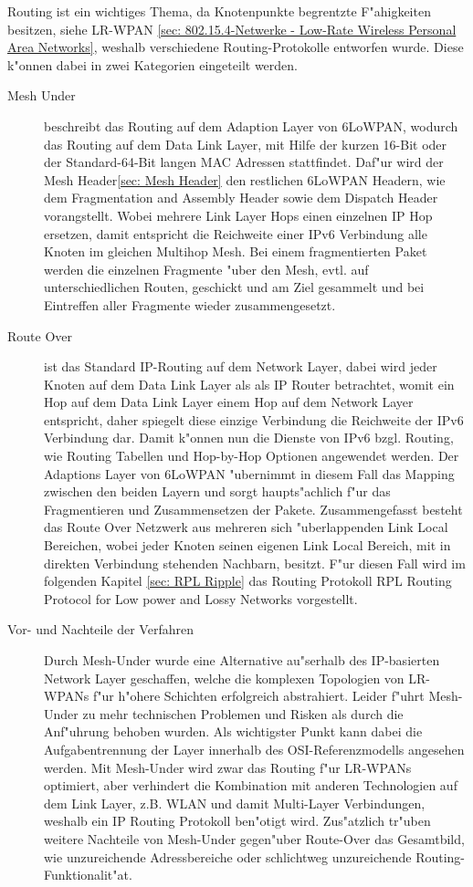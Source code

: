\documentclass[final]{lktseminar}
\begin{document}
Routing ist ein wichtiges Thema, da Knotenpunkte begrentzte F"ahigkeiten besitzen, siehe LR-WPAN
\ref{sec: 802.15.4-Netwerke - Low-Rate Wireless Personal Area Networks},
weshalb verschiedene Routing-Protokolle entworfen wurde. Diese k"onnen dabei in zwei
Kategorien eingeteilt werden.
\begin{description}
    \item[Mesh Under] beschreibt das Routing auf dem Adaption Layer von 6LoWPAN, wodurch
    das Routing auf dem Data Link Layer, mit Hilfe der kurzen 16-Bit oder der Standard-64-Bit langen MAC Adressen stattfindet.
    Daf"ur wird der Mesh Header\ref{sec: Mesh Header} den restlichen 6LoWPAN Headern,
    wie dem Fragmentation and Assembly Header sowie dem Dispatch Header vorangstellt.
    Wobei mehrere Link Layer Hops einen einzelnen IP Hop ersetzen, damit entspricht die Reichweite einer IPv6 Verbindung
    alle Knoten im gleichen Multihop Mesh. Bei einem fragmentierten Paket werden die einzelnen Fragmente
    "uber den Mesh, evtl. auf unterschiedlichen Routen, geschickt und am Ziel gesammelt und
    bei Eintreffen aller Fragmente wieder zusammengesetzt.

    \item[Route Over] ist das Standard IP-Routing auf dem Network Layer, dabei wird jeder Knoten
    auf dem Data Link Layer als als IP Router betrachtet, womit ein Hop auf dem Data Link Layer einem
    Hop auf dem Network Layer entspricht, daher spiegelt diese einzige Verbindung die Reichweite der IPv6 Verbindung dar.
    Damit k"onnen nun die Dienste von IPv6 bzgl. Routing, wie Routing Tabellen und Hop-by-Hop Optionen
    angewendet werden. Der Adaptions Layer von 6LoWPAN "ubernimmt in diesem Fall das Mapping zwischen
    den beiden Layern und sorgt haupts"achlich f"ur das Fragmentieren und Zusammensetzen der Pakete.
    Zusammengefasst besteht das Route Over Netzwerk aus mehreren sich "uberlappenden Link Local Bereichen,
    wobei jeder Knoten seinen eigenen Link Local Bereich, mit in direkten Verbindung stehenden Nachbarn, besitzt.
    F"ur diesen Fall wird im folgenden Kapitel \ref{sec: RPL Ripple} das Routing Protokoll
    RPL Routing Protocol for Low power and Lossy Networks vorgestellt.

    \item[Vor- und Nachteile der Verfahren] \cite{routing_draft} Durch Mesh-Under wurde eine Alternative au"serhalb
    des IP-basierten Network Layer geschaffen, welche die komplexen Topologien von LR-WPANs
    f"ur h"ohere Schichten erfolgreich abstrahiert. Leider f"uhrt Mesh-Under zu mehr technischen Problemen
    und Risken als durch die Anf"uhrung behoben wurden. Als wichtigster Punkt kann dabei die Aufgabentrennung
    der Layer innerhalb des OSI-Referenzmodells angesehen werden. Mit Mesh-Under wird zwar das Routing f"ur
    LR-WPANs optimiert, aber verhindert die Kombination mit anderen Technologien auf dem Link Layer, z.B. WLAN und damit
    Multi-Layer Verbindungen, weshalb ein IP Routing Protokoll ben"otigt wird.
    Zus"atzlich tr"uben weitere Nachteile von Mesh-Under gegen"uber Route-Over das Gesamtbild,
    wie unzureichende Adressbereiche oder schlichtweg unzureichende Routing-Funktionalit"at.


\end{description}
\end{document}
